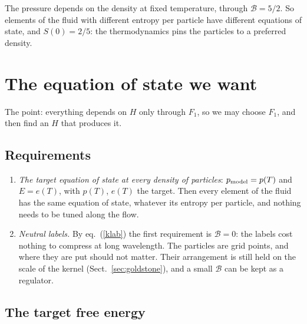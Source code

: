 \documentclass[11pt,aps,preprint,nofootinbib,superscriptaddress,tightenlines]{revtex4-2}
\newcommand{\klab}{\mathcal B}
\def\Eq#1{eq.~(\ref{#1})}
\def\Sect#1{Sect.~\ref{#1}}
\begin{document}
The pressure depends on the density at fixed temperature, through $\klab=5/2$.  So elements of the fluid with different entropy per particle have different
equations of state, and $S(0)=2/5$: the thermodynamics pins the particles to a preferred density.

\section{The equation of state we want}
\label{sec:target}

The point: everything depends on $H$ only through $F_1$, so we may choose $F_1$, and then find an $H$ that produces it.

\subsection{Requirements}
\label{sec:requirements}

\begin{enumerate}
\item \emph{The target equation of state at every density of particles}: $p_{\rm model}=p(T)$ and $E=e(T)$, with $p(T)$, $e(T)$ the target.  Then every element of the
  fluid has the same equation of state, whatever its entropy per particle, and nothing needs to be tuned along the flow.
\item \emph{Neutral labels.}  By \Eq{klab} the first requirement is $\klab=0$: the labels cost nothing to compress at long wavelength.  The particles are grid points,
  and where they are put should not matter.  Their arrangement is still held on the scale of the kernel (\Sect{sec:goldstone}), and a small $\klab$ can be kept as a
  regulator.
\end{enumerate}

\subsection{The target free energy}
\label{sec:targetF}
\end{document}
